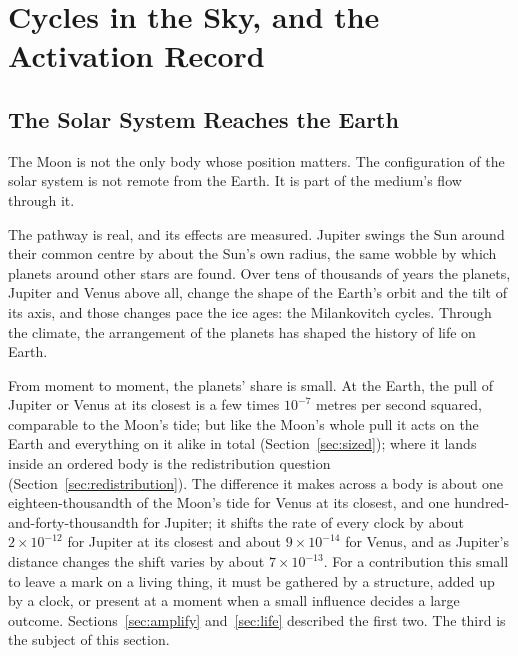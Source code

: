 \documentclass[11pt,a4paper]{article}
\begin{document}
\section{Cycles in the Sky, and the Activation Record}
\label{sec:cycles}

\subsection*{The Solar System Reaches the Earth}

The Moon is not the only body whose position matters.  The configuration of the solar system is not remote from the Earth. It is part of the medium's flow through it.

The pathway is real, and its effects are measured. Jupiter swings the Sun around their common centre by about the Sun's own radius, the same wobble by which planets around other stars are found. Over tens of thousands of years the planets, Jupiter and Venus above all, change the shape of the Earth's orbit and the tilt of its axis, and those changes pace the ice ages: the Milankovitch cycles. Through the climate, the arrangement of the planets has shaped the history of life on Earth.

From moment to moment, the planets' share is small. At the Earth, the pull of Jupiter or Venus at its closest is a few times $10^{-7}$ metres per second squared, comparable to the Moon's tide; but like the Moon's whole pull it acts on the Earth and everything on it alike in total (Section~\ref{sec:sized}); where it lands inside an ordered body is the redistribution question (Section~\ref{sec:redistribution}). The difference it makes across a body is about one eighteen-thousandth of the Moon's tide for Venus at its closest, and one hundred-and-forty-thousandth for Jupiter; it shifts the rate of every clock by about $2\times10^{-12}$ for Jupiter at its closest and about $9\times10^{-14}$ for Venus, and as Jupiter's distance changes the shift varies by about $7\times10^{-13}$. For a contribution this small to leave a mark on a living thing, it must be gathered by a structure, added up by a clock, or present at a moment when a small influence decides a large outcome. Sections~\ref{sec:amplify} and~\ref{sec:life} described the first two. The third is the subject of this section.
\end{document}
